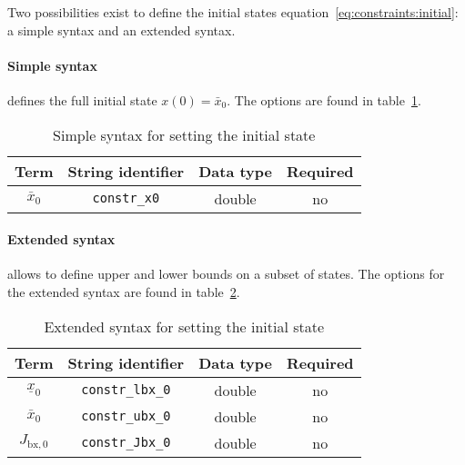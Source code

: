 \documentclass[
a4paper, %
10pt, %
notitlepage,
english]{CSUniSchoolLabReport}
\newcommand{\code}[1]{\texttt{#1}}
\newcommand{\optional}{no}
\begin{document}
\begin{appendices}
Two possibilities exist to define the initial states equation~\eqref{eq:constraints:initial}: a simple syntax and an extended syntax.

\paragraph{Simple syntax}
defines the full initial state $x(0)=\bar{x}_0$. The options are found in table~\ref{tab:constraints:simplesyntax}.
\begin{table}[h!]
	\centering
	\caption{Simple syntax for setting the initial state} \label{tab:constraints:simplesyntax}
	\begin{tabular}{cccc}
		\toprule
		Term & String identifier & Data type & Required \\ \midrule
		$ \bar{x}_0 $ & \code{constr\_x0} & double & \optional \\
		\bottomrule
	\end{tabular}
\end{table}
%
\paragraph{Extended syntax}
allows to define upper and lower bounds on a subset of states.
The options for the extended syntax are found in table~\ref{tab:constraints:extendedsyntax}.
\begin{table}[h!]
	\centering
	\caption{Extended syntax for setting the initial state} \label{tab:constraints:extendedsyntax}
	\begin{tabular}{cccc}
		\toprule
		Term & String identifier & Data type & Required \\ \midrule
		$ \underline{x}_0 $ & \code{constr\_lbx\_0} & double & \optional \\
		$ \bar{x}_0 $ & \code{constr\_ubx\_0} & double & \optional \\
		$ J_{\textrm{bx},0} $ & \code{constr\_Jbx\_0} & double & \optional \\
		\bottomrule
	\end{tabular}
\end{table}
%

\end{appendices}
\end{document}
